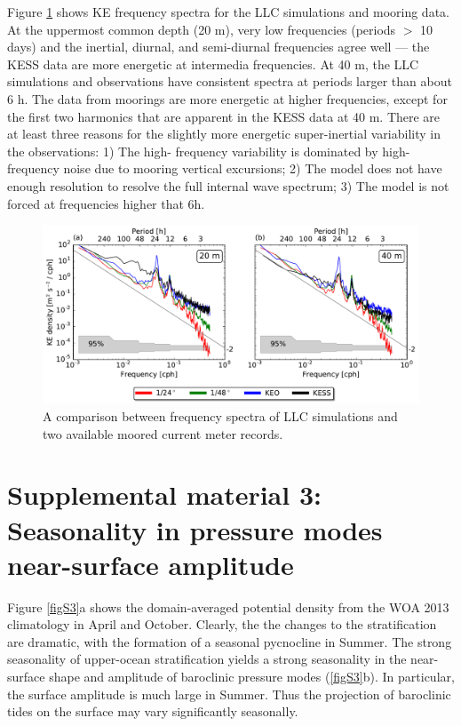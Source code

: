 \documentclass[grl]{agutex2015}
\begin{document}
\begin{article}
Figure \ref{figA1} shows KE frequency spectra for the LLC simulations and mooring data.
At the uppermost common depth (20 m), very low frequencies (periods $>$ 10 days)
and the inertial, diurnal, and semi-diurnal frequencies agree well --- the KESS
data are more energetic at intermedia frequencies. At 40 m, the LLC simulations and observations
have consistent spectra at periods larger than about 6 h. The data from moorings
are more energetic at higher frequencies,
except for the first two harmonics that are apparent in the KESS data at 40 m.
There are at least three reasons for the slightly more energetic super-inertial
variability in the observations: 1) The high-
frequency variability is dominated by high-frequency noise due to mooring vertical
excursions; 2) The model does not have enough resolution to resolve the full internal
wave spectrum; 3) The model is not forced at frequencies higher that 6h.

\begin{figure}[ht]
   \begin{center}
     \includegraphics[width=.9\textwidth]{figs/figA1.pdf}
  \caption{A comparison between frequency spectra of LLC simulations and two
  available moored current meter records.}
  \label{figA1}
  \end{center}
\end{figure}

\section*{Supplemental material 3: Seasonality in pressure modes near-surface amplitude}

Figure \ref{figS3}a shows the domain-averaged potential density from the WOA 2013
climatology in April and October. Clearly, the the changes to the stratification
are dramatic, with the formation of a seasonal pycnocline in Summer. The strong
seasonality of upper-ocean stratification yields a strong seasonality in the
near-surface shape and amplitude of baroclinic pressure modes (\ref{figS3}b).
In particular, the surface amplitude is much large in Summer. Thus the projection
of baroclinic tides on the surface may vary significantly seasonally.


\end{article}
\end{document}
